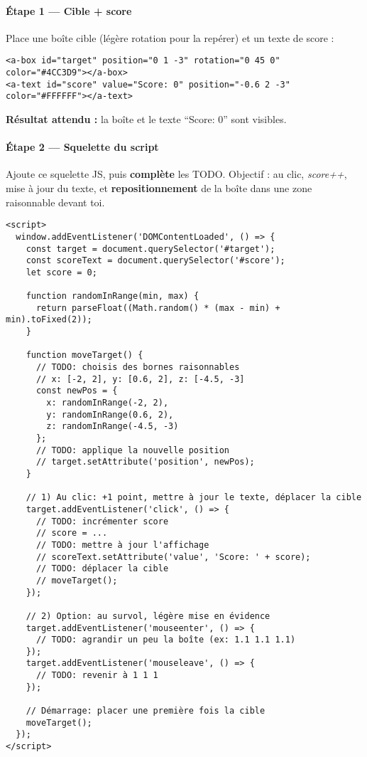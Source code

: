 \documentclass[12pt]{article}
\begin{document}
\paragraph{Étape 1 — Cible + score}
Place une boîte cible (légère rotation pour la repérer) et un texte de score :

\begin{verbatim}
<a-box id="target" position="0 1 -3" rotation="0 45 0" color="#4CC3D9"></a-box>
<a-text id="score" value="Score: 0" position="-0.6 2 -3" color="#FFFFFF"></a-text>
\end{verbatim}

\begin{checkpoint}
\textbf{Résultat attendu :} la boîte et le texte “Score: 0” sont visibles.
\end{checkpoint}

\paragraph{Étape 2 — Squelette du script}
Ajoute ce squelette JS, puis \textbf{complète} les TODO. Objectif : au clic, \textit{score++}, mise à jour du texte, et \textbf{repositionnement} de la boîte dans une zone raisonnable devant toi.

\begin{verbatim}
<script>
  window.addEventListener('DOMContentLoaded', () => {
    const target = document.querySelector('#target');
    const scoreText = document.querySelector('#score');
    let score = 0;

    function randomInRange(min, max) {
      return parseFloat((Math.random() * (max - min) + min).toFixed(2));
    }

    function moveTarget() {
      // TODO: choisis des bornes raisonnables
      // x: [-2, 2], y: [0.6, 2], z: [-4.5, -3]
      const newPos = {
        x: randomInRange(-2, 2),
        y: randomInRange(0.6, 2),
        z: randomInRange(-4.5, -3)
      };
      // TODO: applique la nouvelle position
      // target.setAttribute('position', newPos);
    }

    // 1) Au clic: +1 point, mettre à jour le texte, déplacer la cible
    target.addEventListener('click', () => {
      // TODO: incrémenter score
      // score = ...
      // TODO: mettre à jour l'affichage
      // scoreText.setAttribute('value', 'Score: ' + score);
      // TODO: déplacer la cible
      // moveTarget();
    });

    // 2) Option: au survol, légère mise en évidence
    target.addEventListener('mouseenter', () => {
      // TODO: agrandir un peu la boîte (ex: 1.1 1.1 1.1)
    });
    target.addEventListener('mouseleave', () => {
      // TODO: revenir à 1 1 1
    });

    // Démarrage: placer une première fois la cible
    moveTarget();
  });
</script>
\end{verbatim}
\end{document}
